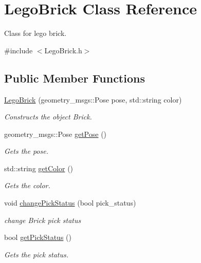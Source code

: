 \hypertarget{classLegoBrick}{}\section{Lego\+Brick Class Reference}
\label{classLegoBrick}


Class for lego brick.  




{\ttfamily \#include $<$Lego\+Brick.\+h$>$}

\subsection*{Public Member Functions}
\begin{DoxyCompactItemize}
\item 
\hyperlink{classLegoBrick_a345461757f7bc8fda2d976ce0a4ca236}{Lego\+Brick} (geometry\+\_\+msgs\+::\+Pose pose, std\+::string color)
\begin{DoxyCompactList}\small\item\em Constructs the object Brick. \end{DoxyCompactList}\item 
geometry\+\_\+msgs\+::\+Pose \hyperlink{classLegoBrick_a0090f5877ec371e38b73e665ccb448fa}{get\+Pose} ()
\begin{DoxyCompactList}\small\item\em Gets the pose. \end{DoxyCompactList}\item 
std\+::string \hyperlink{classLegoBrick_a8597b6086efd23bb556a8b04591b40d0}{get\+Color} ()
\begin{DoxyCompactList}\small\item\em Gets the color. \end{DoxyCompactList}\item 
void \hyperlink{classLegoBrick_ad9755a0a5cf319fa4ecf5d48f2185acb}{change\+Pick\+Status} (bool pick\+\_\+status)
\begin{DoxyCompactList}\small\item\em change Brick pick status \end{DoxyCompactList}\item 
bool \hyperlink{classLegoBrick_aecd1860a3d18ad762c17f1b5761f5551}{get\+Pick\+Status} ()
\begin{DoxyCompactList}\small\item\em Gets the pick status. \end{DoxyCompactList}\end{DoxyCompactItemize}


